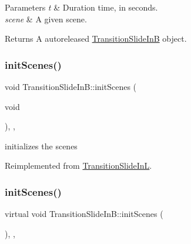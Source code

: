 \begin{DoxyParams}{Parameters}
{\em t} & Duration time, in seconds. \\
\hline
{\em scene} & A given scene. \\
\hline
\end{DoxyParams}
\begin{DoxyReturn}{Returns}
A autoreleased \hyperlink{classTransitionSlideInB}{Transition\+Slide\+InB} object. 
\end{DoxyReturn}
\mbox{\label{classTransitionSlideInB_abe143990b357e249716a54e72249ac96}} 
\subsubsection{\texorpdfstring{init\+Scenes()}{initScenes()}\hspace{0.1cm}{\footnotesize\ttfamily [1/2]}}
{\footnotesize\ttfamily void Transition\+Slide\+In\+B\+::init\+Scenes (\begin{DoxyParamCaption}\item[{void}]{ }\end{DoxyParamCaption})\hspace{0.3cm}{\ttfamily [override]}, {\ttfamily [protected]}, {\ttfamily [virtual]}}

initializes the scenes 

Reimplemented from \hyperlink{classTransitionSlideInL_abac332ac289d8ed399168d7a428be3b7}{Transition\+Slide\+InL}.

\mbox{\label{classTransitionSlideInB_afd38bcea49403ae2b80cd069f46d399c}} 
\subsubsection{\texorpdfstring{init\+Scenes()}{initScenes()}\hspace{0.1cm}{\footnotesize\ttfamily [2/2]}}
{\footnotesize\ttfamily virtual void Transition\+Slide\+In\+B\+::init\+Scenes (\begin{DoxyParamCaption}{ }\end{DoxyParamCaption})\hspace{0.3cm}{\ttfamily [override]}, {\ttfamily [protected]}, {\ttfamily [virtual]}}

